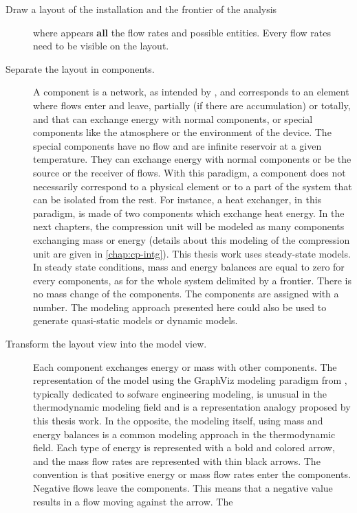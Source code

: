 \begin{description}
\item [Draw a layout of the installation and the frontier of the
  analysis]where appears \textbf{all} the flow rates and possible
  entities. Every flow rates need to be visible on the layout.
\item[Separate the layout in components.] A component is a network, as
  intended by \citet[p.\,24--25]{Borel-Favrat-2010a}, and corresponds
  to an element where flows enter and leave, partially (if there are
  accumulation) or totally, and that can exchange energy with normal
  components, or special components like the atmosphere or the
  environment of the device. The special components have no flow and
  are infinite reservoir at a given temperature. They can exchange
  energy with normal components or be the source or the receiver of
  flows. With this paradigm, a component does not necessarily
  correspond to a physical element or to a part of the system that can
  be isolated from the rest. For instance, a heat exchanger, in this
  paradigm, is made of two components which exchange heat energy. In
  the next chapters, the compression unit will be modeled as many
  components exchanging mass or energy (details about this modeling of
  the compression unit are given in \cref{chap:cp-intg}). This thesis
  work uses steady-state models. In steady state conditions, mass and
  energy balances are equal to zero for every components, as for the
  whole system delimited by a frontier. There is no mass change of the
  components. The components are assigned with a number. The modeling
  approach presented here could also be used to generate quasi-static
  models or dynamic models.
\item[Transform the layout view into the model view.] Each component
  exchanges energy or mass with other components. The representation
  of the model using the GraphViz modeling paradigm from
  \citet{Gansner-North-2000a}, typically dedicated to sofware
  engineering modeling, is unusual in the thermodynamic modeling field
  and is a representation analogy proposed by this thesis work. In the
  opposite, the modeling itself, using mass and energy balances is a
  common modeling approach in the thermodynamic field. Each type of
  energy is represented with a bold and colored arrow, and the mass
  flow rates are represented with thin black arrows. The convention is
  that positive energy or mass flow rates enter the
  components. Negative flows leave the components. This means that a
  negative value results in a flow moving against the arrow. The

\end{description}
